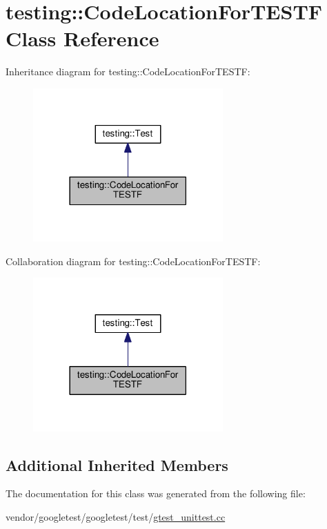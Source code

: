 \hypertarget{classtesting_1_1CodeLocationForTESTF}{}\section{testing\+:\+:Code\+Location\+For\+T\+E\+S\+TF Class Reference}
\label{classtesting_1_1CodeLocationForTESTF}


Inheritance diagram for testing\+:\+:Code\+Location\+For\+T\+E\+S\+TF\+:\nopagebreak
\begin{figure}[H]
\begin{center}
\leavevmode
\includegraphics[width=206pt]{classtesting_1_1CodeLocationForTESTF__inherit__graph}
\end{center}
\end{figure}


Collaboration diagram for testing\+:\+:Code\+Location\+For\+T\+E\+S\+TF\+:\nopagebreak
\begin{figure}[H]
\begin{center}
\leavevmode
\includegraphics[width=206pt]{classtesting_1_1CodeLocationForTESTF__coll__graph}
\end{center}
\end{figure}
\subsection*{Additional Inherited Members}


The documentation for this class was generated from the following file\+:\begin{DoxyCompactItemize}
\item 
vendor/googletest/googletest/test/\hyperlink{gtest__unittest_8cc}{gtest\+\_\+unittest.\+cc}\end{DoxyCompactItemize}
